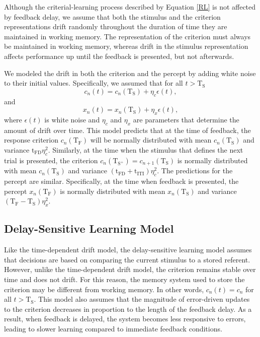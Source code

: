 \documentclass[doc, floatsintext]{apa7}
\begin{document}
Although the criterial-learning process described by
Equation \ref{RL} is not affected by feedback delay, we
assume that both the stimulus and the criterion
representations drift randomly throughout the duration of
time they are maintained in working memory. The
representation of the criterion must always be maintained in
working memory, whereas drift in the stimulus representation
affects performance up until the feedback is presented, but
not afterwards.

We modeled the drift in both the criterion and the percept
by adding white noise to their initial values. Specifically,
we assumed that for all $t>\text{T}_\text{S}$
\begin{equation}
  c_n(t) = c_n(\text{T}_\text{S}) + \eta_c \epsilon(t),
  \label{eq:criterion}
\end{equation}
and
\begin{equation}
  x_n(t) = x_n(\text{T}_\text{S}) + \eta_x \epsilon(t),
  \label{eq:percept}
\end{equation}
where $\epsilon(t)$ is white noise and $\eta_c$ and $\eta_x$
are parameters that determine the amount of drift over time.
This model predicts that at the time of feedback, the
response criterion $c_n(\text{T}_\text{F})$ will be normally
distributed with mean $c_n(\text{T}_\text{S})$ and variance
$\text{t}_\text{FD} \eta_c^2$. Similarly, at the time when
the stimulus that defines the next trial is presented, the
criterion $c_n(\text{T}_{\text{S}^+}) =
c_{n+1}(\text{T}_\text{S})$ is normally distributed with
mean $c_n(\text{T}_\text{S})$ and variance
$(\text{t}_\text{FD}+\text{t}_\text{ITI}) \eta_c^2$. The
predictions for the percept are similar. Specifically, at
the time when feedback is presented, the percept
$x_n(\text{T}_\text{F})$ is normally distributed with mean
$x_n(\text{T}_\text{S})$ and variance
$(\text{T}_\text{F}-\text{T}_\text{S}) \eta_x^2$.

\subsection{Delay-Sensitive Learning Model}
Like the time-dependent drift model, the delay-sensitive
learning model assumes that decisions are based on comparing
the current stimulus to a stored referent. However, unlike
the time-dependent drift model, the criterion remains stable
over time and does not drift. For this reason, the memory
system used to store the criterion may be different from
working memory. In other words, $c_n(t)=c_n$ for all
$t>\text{T}_\text{S}$. This model also assumes that the
magnitude of error-driven updates to the criterion decreases
in proportion to the length of the feedback delay.  As a
result, when feedback is delayed, the system becomes less
responsive to errors, leading to slower learning compared to
immediate feedback conditions. 
\end{document}
